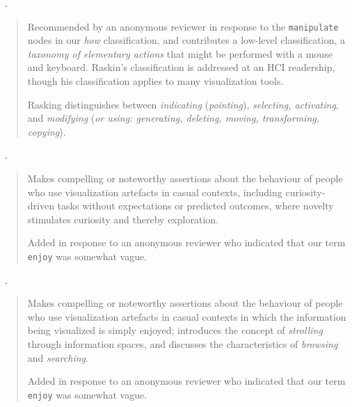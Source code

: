 \begin{sloppypar}
~\cite{Raskin2000}. \end{sloppypar}

\begin{quotation}
    Recommended by an anonymous reviewer in response to the {\tt manipulate} nodes in our {\it how} classification, and contributes a low-level classification, a {\it taxonomy of elementary actions} that might be performed with a mouse and keyboard.
    Raskin's classification is addressed at an \ac{HCI} readership, though his classification applies to many visualization tools.
    
    Rasking distinguishes between {\it indicating} ({\it pointing}), {\it selecting, activating}, and {\it modifying} ({\it or using: generating, deleting, moving, transforming, copying}). 
\end{quotation}

\begin{sloppypar}
~\cite{Dork2011}. \end{sloppypar}

\begin{quotation}
    \begin{sloppypar}
    Makes compelling or noteworthy assertions about the behaviour of people who use visualization artefacts in casual contexts, including curiosity-driven tasks without expectations or predicted outcomes, where novelty stimulates curiosity and thereby exploration.
    \end{sloppypar}
    
    Added in response to an anonymous reviewer who indicated that our term {\tt enjoy} was somewhat vague.
\end{quotation}

\begin{sloppypar}
~\cite{Dork2012}. \end{sloppypar}

\begin{quotation}
    Makes compelling or noteworthy assertions about the behaviour of people who use visualization artefacts in casual contexts in which the information being visualized is simply enjoyed; introduces the concept of {\it strolling} through information spaces, and discusses the characteristics of {\it browsing} and {\it searching}.
    
    Added in response to an anonymous reviewer who indicated that our term {\tt enjoy} was somewhat vague.
\end{quotation}

